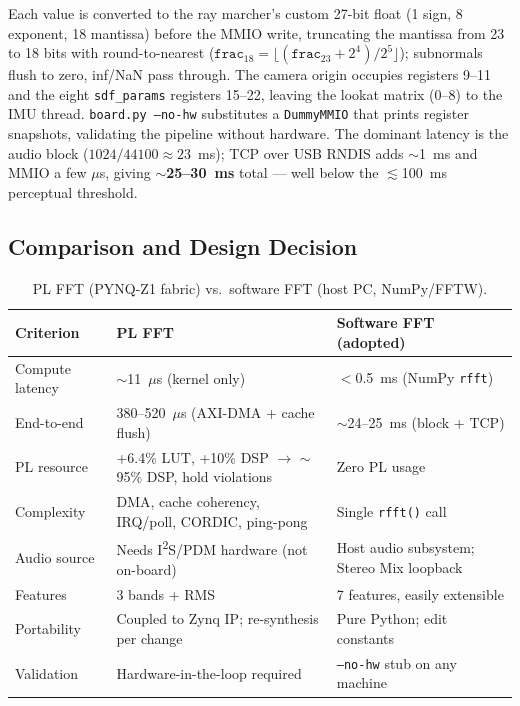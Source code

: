 Each value is converted to the ray marcher's custom 27-bit float (1 sign, 8
exponent, 18 mantissa) before the MMIO write, truncating the mantissa from 23 to
18 bits with round-to-nearest
($\texttt{frac}_{18}=\lfloor(\texttt{frac}_{23}+2^4)/2^5\rfloor$); subnormals
flush to zero, inf/NaN pass through. The camera origin occupies registers 9--11
and the eight \texttt{sdf\_params} registers 15--22, leaving the lookat matrix
(0--8) to the IMU thread. \texttt{board.py --no-hw} substitutes a
\texttt{DummyMMIO} that prints register snapshots, validating the pipeline
without hardware. The dominant latency is the audio block
($1024/44100\approx23$~ms); TCP over USB RNDIS adds $\sim$1~ms and MMIO a few
$\mu$s, giving \textbf{$\sim$25--30~ms} total --- well below the
$\lesssim$100~ms perceptual threshold.

\subsection{Comparison and Design Decision}
\label{ssec:fft_comparison}

\begin{table}[h]
\centering
\caption{PL FFT (PYNQ-Z1 fabric) vs.\ software FFT (host PC, NumPy/FFTW).}
\label{tab:fft_comparison}
\begin{tabular}{lp{4.6cm}p{4.6cm}}
\toprule
\textbf{Criterion} & \textbf{PL FFT} & \textbf{Software FFT (adopted)} \\
\midrule
Compute latency & $\sim$11~$\mu$s (kernel only) & $<$0.5~ms (NumPy \texttt{rfft}) \\[3pt]
End-to-end & 380--520~$\mu$s (AXI-DMA + cache flush) & $\sim$24--25~ms (block + TCP) \\[3pt]
PL resource & +6.4\% LUT, +10\% DSP $\to$ $\sim$95\% DSP, hold violations & Zero PL usage \\[3pt]
Complexity & DMA, cache coherency, IRQ/poll, CORDIC, ping-pong & Single \texttt{rfft()} call \\[3pt]
Audio source & Needs I\textsuperscript{2}S/PDM hardware (not on-board) & Host audio subsystem; Stereo Mix loopback \\[3pt]
Features & 3 bands + RMS & 7 features, easily extensible \\[3pt]
Portability & Coupled to Zynq IP; re-synthesis per change & Pure Python; edit constants \\[3pt]
Validation & Hardware-in-the-loop required & \texttt{--no-hw} stub on any machine \\
\bottomrule
\end{tabular}
\end{table}

